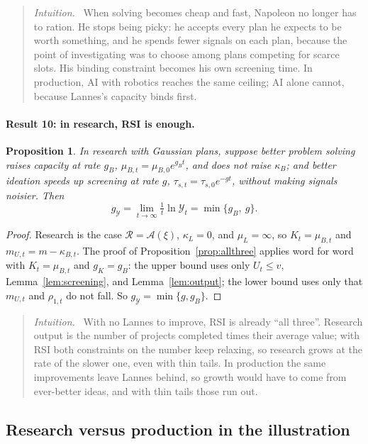 \documentclass[11pt]{article}
\newcommand{\Nap}{\textcolor{nap}{Napoleon}}
\newcommand{\Lan}{\textcolor{lan}{Lannes}}
\newtheorem{proposition}{Proposition}
\theoremstyle{remark}
\newenvironment{intuition}{\begin{quote}\small\color{muted}\textit{Intuition.}\ }{\end{quote}}
\newcommand{\Ycal}{\mathcal{Y}}
\newcommand{\Rcal}{\mathcal{R}}
\newcommand{\Acal}{\mathcal{A}}
\begin{document}
\begin{intuition}
When solving becomes cheap and fast, \Nap{} no longer has to ration. He stops being picky: he accepts every plan he expects to be worth something, and he spends fewer signals on each plan, because the point of investigating was to choose among plans competing for scarce slots. His binding constraint becomes his own screening time. In production, AI with robotics reaches the same ceiling; AI alone cannot, because \Lan's capacity binds first.
\end{intuition}

\paragraph{Result 10: in research, RSI is enough.}

\begin{proposition}\label{prop:resgrowth}
In research with Gaussian plans, suppose better problem solving raises capacity at rate $g_B$, $\mu_{B,t}=\mu_{B,0}e^{g_Bt}$, and does not raise $\kappa_B$; and better ideation speeds up screening at rate $g$, $\tau_{s,t}=\tau_{s,0}e^{-gt}$, without making signals noisier. Then
\[
g_{\Ycal}=\lim_{t\to\infty}\tfrac1t\ln\Ycal_t=\min\{g_B,\ g\}.
\]
\end{proposition}

\begin{proof}
Research is the case $\Rcal=\Acal(\xi)$, $\kappa_L=0$, and $\mu_L=\infty$, so $K_t=\mu_{B,t}$ and $m_{U,t}=m-\kappa_{B,t}$. The proof of Proposition~\ref{prop:allthree} applies word for word with $K_t=\mu_{B,t}$ and $g_K=g_B$: the upper bound uses only $U_t\le v$, Lemma~\ref{lem:screening}, and Lemma~\ref{lem:output}; the lower bound uses only that $m_{U,t}$ and $\rho_{1,t}$ do not fall. So $g_{\Ycal}=\min\{g,g_B\}$.
\end{proof}

\begin{intuition}
With no \Lan{} to improve, RSI is already ``all three''. Research output is the number of projects completed times their average value; with RSI both constraints on the number keep relaxing, so research grows at the rate of the slower one, even with thin tails. In production the same improvements leave \Lan{} behind, so growth would have to come from ever-better ideas, and with thin tails those run out.
\end{intuition}

\subsection{Research versus production in the illustration}
\end{document}
